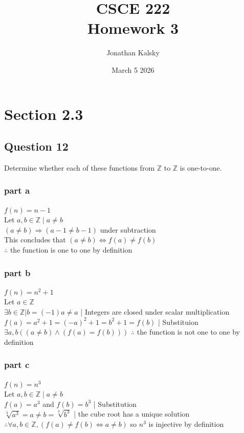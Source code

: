 \documentclass{article}
\author{Jonathan Kalsky}
\date{March 5 2026}
\title{\normalsize CSCE 222\\ \Large Homework 3}
\begin{document}
\maketitle
\tableofcontents
\vspace{1cm}
\section{Section 2.3}
\subsection{Question 12}
Determine whether each of these functions from $\mathbb{Z}$ to $\mathbb{Z}$
is one-to-one.
\subsubsection{part a}
$f(n) = n - 1$\\
Let $a,b \in \mathbb{Z} \mid a \neq b$\\
$(a \neq b) \Rightarrow (a-1 \neq b-1)$ under subtraction\\
This concludes that 
$(a \neq b) \iff f(a) \neq f(b)$\\
$\therefore$ the function is one to one by definition

\subsubsection{part b}
$f(n) = n^2 + 1$\\
Let $a \in \mathbb{Z}$\\
$\exists b \in \mathbb{Z} | b = (-1)a \neq a$ | Integers are closed under scalar multiplication\\
$f(a) = a^2 + 1 = (-a)^2 + 1 = b^2 + 1 = f(b)$ | Substituion\\
$\exists a,b ((a \neq b) \land (f(a) = f(b)))$
$\therefore$ the function is not one to one by definition

\subsubsection{part c}
$f(n) = n^3$\\
Let $a,b \in \mathbb{Z} \mid a \neq b$\\
$f(a) = a^3$ and $f(b) = b^3$ | Substitution\\
$\sqrt[3]{a^3} = a \neq b = \sqrt[3]{b^3}$ | the cube root has a unique solution\\
$\therefore \forall a,b \in \mathbb{Z}, (f(a) \neq f(b) \iff a \neq b)$  so $n^3$ is injective by definition
\end{document}

